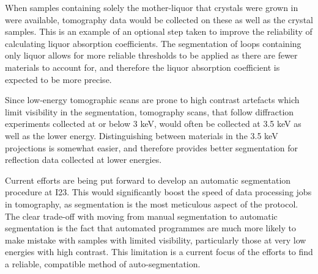 When samples containing solely the mother-liquor that crystals were grown in were available, tomography data would be collected on these as well as the crystal samples. This is an example of an optional step taken to improve the reliability of calculating liquor absorption coefficients. The segmentation of loops containing only liquor allows for more reliable thresholds to be applied as there are fewer materials to account for, and therefore the liquor absorption coefficient is expected to be more precise.

Since low-energy tomographic scans are prone to high contrast artefacts which limit visibility in the segmentation, tomography scans, that follow diffraction experiments collected at or below 3 \unit{keV}, would often be collected at 3.5 \unit{keV} as well as the lower energy. Distinguishing between materials in the 3.5 \unit{keV} projections is somewhat easier, and therefore provides better segmentation for reflection data collected at lower energies.





Current efforts are being put forward to develop an automatic segmentation procedure at I23. This would significantly boost the speed of data processing jobs in tomography, as segmentation is the most meticulous aspect of the protocol. The clear trade-off with moving from manual segmentation to automatic segmentation is the fact that automated programmes are much more likely to make mistake with samples with limited visibility, particularly those at very low energies with high contrast. This limitation is a current focus of the efforts to find a reliable, compatible method of auto-segmentation. 




